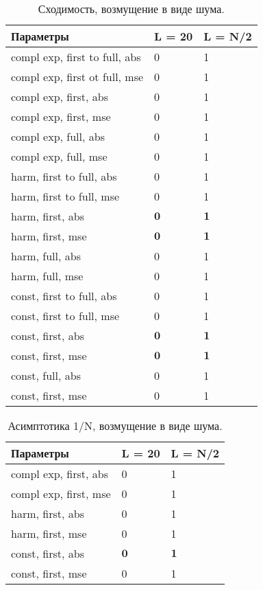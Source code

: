 \documentclass[specialist,
               substylefile = spbu.rtx,
               subf,href,colorlinks=true, 12pt]{disser}
\begin{document}
\begin{table}[H]
    \centering
    \caption{Сходимость, возмущение в виде шума.}
    \label{tab:conv_noise}
    \begin{tabular}{|l|l|l|}
    \hline
        Параметры & L = 20 & L = N/2 \\ \hline
        compl exp, first to full, abs & 0 & 1 \\ \hline
        compl exp, first ot full, mse & 0 & 1 \\ \hline
        compl exp, first, abs & 0 & 1 \\ \hline
        compl exp, first, mse & 0 & 1 \\ \hline
        compl exp, full, abs & 0 & 1 \\ \hline
        compl exp, full, mse & 0 & 1 \\ \hline
        harm, first to full, abs & 0 & 1 \\ \hline
        harm, first to full, mse & 0 & 1 \\ \hline
        harm, first, abs & $\mathbf{0}$ & $\mathbf{1}$ \\ \hline
        harm, first, mse & $\mathbf{0}$ & $\mathbf{1}$ \\ \hline
        harm, full, abs & 0 & 1 \\ \hline
        harm, full, mse & 0 & 1 \\ \hline
        const, first to full, abs & 0 & 1 \\ \hline
        const, first to full, mse & 0 & 1 \\ \hline
        const, first, abs & $\mathbf{0}$ & $\mathbf{1}$ \\ \hline
        const, first, mse & $\mathbf{0}$ & $\mathbf{1}$ \\ \hline
        const, full, abs & 0 & 1 \\ \hline
        const, first, mse & 0 & 1 \\ \hline
    \end{tabular}
\end{table}
\begin{table}[H]
    \centering
    \caption{Асимптотика 1/N, возмущение в виде шума.}
    \label{tab:conv_speed_noise}
    \begin{tabular}{|l|l|l|}
    \hline
        Параметры & L = 20 & L = N/2 \\ \hline
        compl exp, first, abs & 0 & 1 \\ \hline
        compl exp, first, mse & 0 & 1 \\ \hline
        harm, first, abs & 0 & 1 \\ \hline
        harm, first, mse & 0 & 1 \\ \hline
        const, first, abs & $\mathbf{0}$ & $\mathbf{1}$ \\ \hline
        const, first, mse & 0 & 1 \\ \hline
    \end{tabular}
\end{table}
\end{document}

